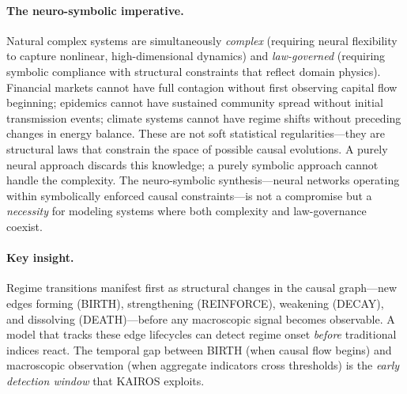 \documentclass[11pt]{article}
\begin{document}
\paragraph{The neuro-symbolic imperative.} Natural complex systems are simultaneously \emph{complex} (requiring neural flexibility to capture nonlinear, high-dimensional dynamics) and \emph{law-governed} (requiring symbolic compliance with structural constraints that reflect domain physics). Financial markets cannot have full contagion without first observing capital flow beginning; epidemics cannot have sustained community spread without initial transmission events; climate systems cannot have regime shifts without preceding changes in energy balance. These are not soft statistical regularities---they are structural laws that constrain the space of possible causal evolutions. A purely neural approach discards this knowledge; a purely symbolic approach cannot handle the complexity. The neuro-symbolic synthesis---neural networks operating within symbolically enforced causal constraints---is not a compromise but a \emph{necessity} for modeling systems where both complexity and law-governance coexist.

\paragraph{Key insight.} Regime transitions manifest first as structural changes in the causal graph---new edges forming (BIRTH), strengthening (REINFORCE), weakening (DECAY), and dissolving (DEATH)---before any macroscopic signal becomes observable. A model that tracks these edge lifecycles can detect regime onset \emph{before} traditional indices react. The temporal gap between BIRTH (when causal flow begins) and macroscopic observation (when aggregate indicators cross thresholds) is the \emph{early detection window} that KAIROS exploits.
\end{document}
